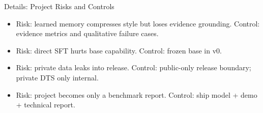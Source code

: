 \begin{frame}{Details: Project Risks and Controls}
  \begin{itemize}
    \item Risk: learned memory compresses style but loses evidence grounding. Control: evidence metrics and qualitative failure cases.
    \item Risk: direct SFT hurts base capability. Control: frozen base in v0.
    \item Risk: private data leaks into release. Control: public-only release boundary; private DTS only internal.
    \item Risk: project becomes only a benchmark report. Control: ship model + demo + technical report.
  \end{itemize}
\end{frame}
